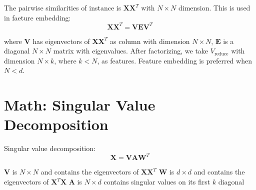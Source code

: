 \begin{multicols}{2}
\noindent The pairwise similarities of instance is $\mathbf{X} \mathbf{X}^{T}$ with $N\times N$ dimension. This is used in faeture embedding:
$$\mathbf{X} \mathbf{X}^{T} = \mathbf{VEV}^{T}$$

\noindent where $\mathbf{V}$ has eigenvectors of $\mathbf{X} \mathbf{X}^{T}$ as column with dimension $N\times N$, $\mathbf{E}$ is a diagonal $N\times N$ matrix with eigenvalues. After factorizing, we take $V_{\text{reduce}}$ with dimension $N\times k$, where $k<N$, as features. Feature embedding is preferred when $N<d$. 

\section{Math: Singular Value Decomposition}
\noindent Singular value decomposition:
$$\mathbf{X} = \mathbf{VAW}^{T}$$

\noindent $\mathbf{V}$ is $N\times N$ and contains the eigenvectors of $\mathbf{XX}^T$
\noindent $\mathbf{W}$ is $d\times d$ and contains the eigenvectors of $\mathbf{X}^T \mathbf{X}$
\noindent $\mathbf{A}$ is $N\times d$ contains singular values on its first $k$ diagonal

\end{multicols}
